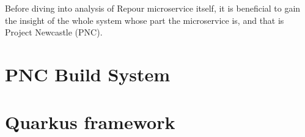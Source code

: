 \documentclass[../../main.tex]{subfiles}
\begin{document}
Before diving into analysis of Repour microservice itself, it is beneficial to gain the insight of the whole system whose part the microservice is, and that is Project Newcastle (PNC).

\section{PNC Build System}
\label{section:pnc}


\section{Quarkus framework}

\end{document}
